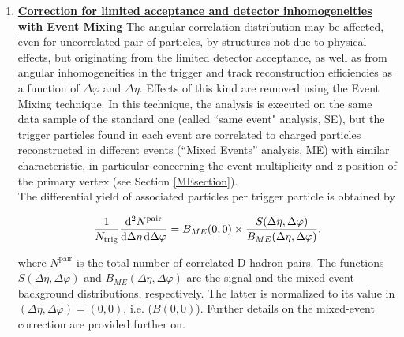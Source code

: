 \begin{enumerate}
\item
\underline{\bf Correction for limited acceptance and detector inhomogeneities with Event Mixing}
The angular correlation distribution may be affected, even for uncorrelated pair of particles, by structures not due to physical effects, but originating from the limited detector acceptance, as well as from angular inhomogeneities in the trigger and track reconstruction efficiencies as a function of $\Delta\varphi$ and $\Delta\eta$.
Effects of this kind are removed using the Event Mixing technique.
In this technique, the analysis is executed on the same data sample of the standard one (called ``same event" analysis, SE), but the trigger particles found in each event are correlated to charged particles reconstructed in different events (``Mixed Events'' analysis, ME) with similar characteristic, in particular concerning the event multiplicity and z position of the primary vertex (see Section \ref{MEsection}). \\

The differential yield of associated particles per trigger particle is obtained by
\begin{linenomath}
  \begin{equation}
    \label{2pcorr_incl}
    \frac{1}{N_\text{trig}}\frac{\mathrm{d}^{2}N^\text{pair}}{\mathrm{d}\Delta\eta\, \mathrm{d}\Delta\varphi}
= B_{ME}(0,0)\times\frac{S(\Delta\eta,\Delta\varphi)}{B_{ME}(\Delta\eta,\Delta\varphi)},
\end{equation}
\end{linenomath}
where $N^\text{pair}$ is the total number of correlated D-hadron
pairs. The functions $S(\Delta\eta,\Delta\varphi)$ and
$B_{ME}(\Delta\eta,\Delta\varphi)$ are the signal and the mixed event
background distributions, respectively. The latter is normalized to its value in
$(\Delta\eta,\Delta\varphi)=(0,0)$, i.e. ($B(0,0)$).
Further details on the mixed-event correction are provided further on.


\end{enumerate}
